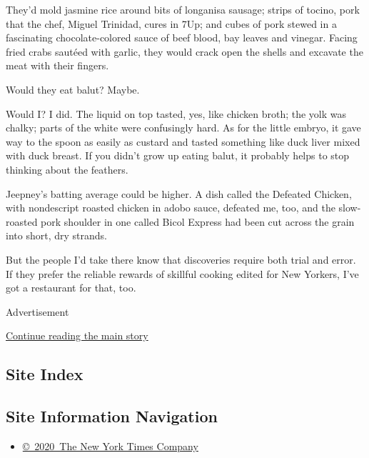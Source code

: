 They'd mold jasmine rice around bits of longanisa sausage; strips of
tocino, pork that the chef, Miguel Trinidad, cures in 7Up; and cubes of
pork stewed in a fascinating chocolate-colored sauce of beef blood, bay
leaves and vinegar. Facing fried crabs sautéed with garlic, they would
crack open the shells and excavate the meat with their fingers.

Would they eat balut? Maybe.

Would I? I did. The liquid on top tasted, yes, like chicken broth; the
yolk was chalky; parts of the white were confusingly hard. As for the
little embryo, it gave way to the spoon as easily as custard and tasted
something like duck liver mixed with duck breast. If you didn't grow up
eating balut, it probably helps to stop thinking about the feathers.

Jeepney's batting average could be higher. A dish called the Defeated
Chicken, with nondescript roasted chicken in adobo sauce, defeated me,
too, and the slow-roasted pork shoulder in one called Bicol Express had
been cut across the grain into short, dry strands.

But the people I'd take there know that discoveries require both trial
and error. If they prefer the reliable rewards of skillful cooking
edited for New Yorkers, I've got a restaurant for that, too.

Advertisement

\protect\hyperlink{after-bottom}{Continue reading the main story}

\hypertarget{site-index}{%
\subsection{Site Index}\label{site-index}}

\hypertarget{site-information-navigation}{%
\subsection{Site Information
Navigation}\label{site-information-navigation}}

\begin{itemize}
\tightlist
\item
  \href{https://help.nytimes3xbfgragh.onion/hc/en-us/articles/115014792127-Copyright-notice}{©~2020~The
  New York Times Company}
\end{itemize}

